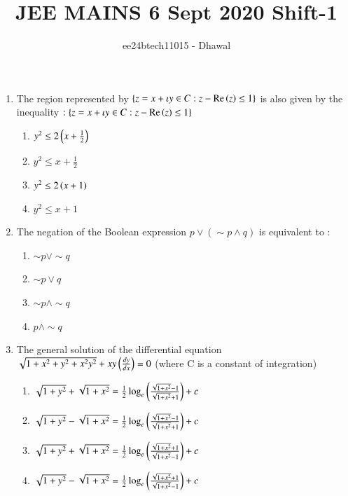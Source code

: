 \documentclass[journal]{IEEEtran}
\theoremstyle{remark}
\begin{document}

\onecolumn

\title{JEE MAINS 6 Sept 2020 Shift-1}
\author{ee24btech11015 - Dhawal}
\maketitle

\renewcommand{\thefigure}{\theenumi}
\renewcommand{\thetable}{\theenumi}

\begin{enumerate}
	\item The region represented by $\left\{ z = x+ \iota y  \in C : z - \text{Re} \left(z\right) \leq 1\right\}$ is also given by the inequality $: \left\{z = x + \iota y \in C : z -\text{Re} \left(z\right) \leq 1\right\}$ \hfill{}
\begin{multicols}{4}
\begin{enumerate}
\item $y^2 \leq 2\left(x + \frac{1}{2}\right)$
\item $y^2 \leq x + \frac{1}{2}$
\item $y^2 \leq 2\left(x + 1\right)$
\item $y^2 \leq x + 1$
\end{enumerate}
\end{multicols}

\item  The negation of the Boolean expression $p \lor (\sim p \land q)$ is equivalent to :

\hfill{}

\begin{multicols}{4}
\begin{enumerate}
\item $\sim p \lor  \sim q$
\item $\sim p \lor q$
\item $\sim p \land \sim q$
\item $p \land \sim q$
\end{enumerate}
\end{multicols}

\item  The general solution of the differential equation $\sqrt{1+x^2+y^2+x^2y^2}+xy\left(\frac{dy}{dx}\right) = 0$ (where C is a constant of integration)\hfill{}

\begin{enumerate}
\item $\sqrt{1 + y^2} + \sqrt{1 + x^2} = \frac{1}{2} \log_e \left( \frac{\sqrt{1 + x^2} - 1}{\sqrt{1 + x^2} + 1} \right) + c $
\item $\sqrt{1 + y^2} - \sqrt{1 + x^2} = \frac{1}{2} \log_e \left( \frac{\sqrt{1 + x^2} - 1}{\sqrt{1 + x^2} + 1} \right) + c $
\item $\sqrt{1 + y^2} + \sqrt{1 + x^2} = \frac{1}{2} \log_e \left( \frac{\sqrt{1 + x^2} + 1}{\sqrt{1 + x^2} - 1} \right) + c $
\item $\sqrt{1 + y^2} - \sqrt{1 + x^2} = \frac{1}{2} \log_e \left( \frac{\sqrt{1 + x^2} + 1}{\sqrt{1 + x^2} - 1} \right) + c $
\end{enumerate}



\end{enumerate}
\end{document}
